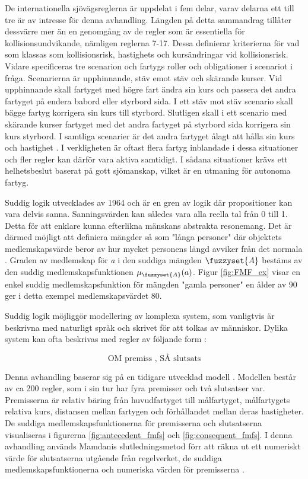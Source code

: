 De internationella sjövägsreglerna är uppdelat i fem delar, varav delarna ett till tre är av intresse för denna avhandling. Längden på detta sammandrag tillåter dessvärre mer än en genomgång av de regler som är essentiella för kollisionsundvikande, nämligen reglerna 7-17. Dessa definierar kriterierna för vad som klassas som kollisionsrisk, hastighets och kursändringar vid kollisionsrisk. Vidare specificeras tre scenarion och fartygs roller och obligationer i scenariot i fråga. Scenarierna är upphinnande, stäv emot stäv och skärande kurser. Vid upphinnande skall fartyget med högre fart ändra sin kurs och passera det andra fartyget på endera babord eller styrbord sida. I ett stäv mot stäv scenario skall bägge fartyg korrigera sin kurs till styrbord. Slutligen skall i ett scenario med skärande kurser fartyget med det andra fartyget på styrbord sida korrigera sin kurs styrbord. I samtliga scenarier är det andra fartyget ålagt att hålla sin kurs och hastighet \cite{colreg}. I verkligheten är oftast flera fartyg inblandade i dessa situationer och fler regler kan därför vara aktiva samtidigt. I sådana situationer krävs ett helhetsbeslut baserat på gott sjömanskap, vilket är en utmaning för autonoma fartyg.


Suddig logik utvecklades av \textcite{zadeh1996fuzzy} 1964 och är en gren av logik där propositioner kan vara delvis sanna. Sanningsvärden kan således vara alla reella tal från 0 till 1. Detta för att  enklare kunna efterlikna mänskans abstrakta resonemang.  Det är därmed möjligt att definiera mängder så som  "långa personer"  där objektets medlemskapsvärde beror av hur mycket personens längd avviker från det normala \cite{chen2000introduction}.  Graden av medlemskap för \textit{a} i den suddiga mängden $\fuzzyset{A}$ bestäms av den suddig medlemskapsfunktionen $\mu_{\fuzzyset{A}}(a)$.   Figur \ref{fig:FMF_ex} visar en enkel suddig medlemskapsfunktion för mängden "gamla personer" en ålder av 90 ger i detta exempel medlemskapsvärdet 80.

Suddig logik möjliggör  modellering av komplexa system, som vanligtvis är beskrivna med naturligt språk och skrivet för att tolkas av människor. Dylika system kan ofta beskrivas med regler av följande form :

\begin{equation}
    \text{OM premiss , SÅ slutsats}
\end{equation}



Denna avhandling baserar sig på en tidigare utvecklad modell . Modellen består av ca 200 regler, som i sin tur har fyra premisser och två slutsatser var.  Premisserna är relativ bäring från huvudfartyget till målfartyget, målfartygets relativa kurs, distansen mellan fartygen och förhållandet mellan deras hastigheter. De suddiga medlemskapsfunktionerna för premisserna och slutsatserna visualiseras i figurerna \ref{fig:antecedent_fmfs} och \ref{fig:consequent_fmfs}.  I denna avhandling används Mamdanis  slutledningsmetod förr att räkna ut ett numeriskt värde för slutsatserna utgående från regelverket, de suddiga medlemskapsfunktionerna och numeriska värden för premisserna \cite{perera2010smooth_param,perera2012intelligent}.


